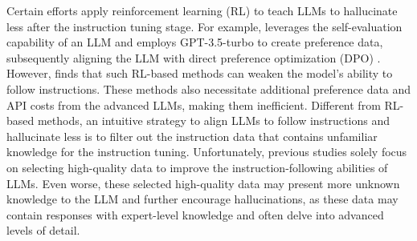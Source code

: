 Certain efforts \citep{lin2024flame, zhang-etal-2024-self, tian2024finetuning} apply reinforcement learning (RL) to teach LLMs to hallucinate less after the instruction tuning stage.
For example, \citet{zhang-etal-2024-self} leverages the self-evaluation capability of an LLM and employs GPT-3.5-turbo \citep{chatgpt2022} to create preference data, subsequently aligning the LLM with direct preference optimization (DPO) \citep{dpo}.
However, \citet{lin2024flame} finds that such RL-based methods can weaken the model's ability to follow instructions.
These methods also necessitate additional preference data and API costs from the advanced LLMs, making them inefficient.
Different from RL-based methods, an intuitive strategy to align LLMs to follow instructions and hallucinate less is to filter out the instruction data that contains unfamiliar knowledge for the instruction tuning.
Unfortunately, previous studies \citep{ liu2024what, cao2024instructionmininginstructiondata} solely focus on selecting high-quality data to improve the instruction-following abilities of LLMs.
Even worse, these selected high-quality data may present more unknown knowledge to the LLM and further encourage hallucinations, as these data may contain responses with expert-level knowledge and often delve into advanced levels of detail.

